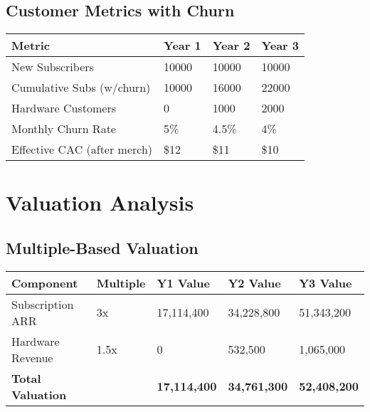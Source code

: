 \documentclass[11pt]{article}
\newcommand{\newSubsYearOne}{10000}
\newcommand{\newSubsYearTwo}{10000}
\newcommand{\newSubsYearThree}{10000}
\newcommand{\totalSubsYearOne}{10000}
\newcommand{\totalSubsYearTwo}{16000}
\newcommand{\totalSubsYearThree}{22000}
\newcommand{\hwCustomersYearTwo}{1000}
\newcommand{\hwCustomersYearThree}{2000}
\newcommand{\churnYearOne}{5}
\newcommand{\churnYearTwo}{4.5}
\newcommand{\churnYearThree}{4}
\newcommand{\arrMultiple}{3}
\newcommand{\hwMultiple}{1.5}
\begin{document}
\subsection{Customer Metrics with Churn}
\begin{table}[H]
\centering
\begin{tabularx}{\linewidth}{l Y Y Y}
\toprule
Metric & Year 1 & Year 2 & Year 3 \\\midrule
New Subscribers & \newSubsYearOne & \newSubsYearTwo & \newSubsYearThree \\
Cumulative Subs (w/churn) & \totalSubsYearOne & \totalSubsYearTwo & \totalSubsYearThree \\
Hardware Customers & 0 & \hwCustomersYearTwo & \hwCustomersYearThree \\
Monthly Churn Rate\cite{recurly2024} & \churnYearOne\% & \churnYearTwo\% & \churnYearThree\% \\
Effective CAC (after merch) & \$12 & \$11 & \$10 \\
\bottomrule
\end{tabularx}
\end{table}

\section{Valuation Analysis}

\subsection{Multiple-Based Valuation}
\begin{table}[H]
\centering
\begin{tabularx}{\linewidth}{l Y Y Y Y}
\toprule
Component & Multiple\cite{highalpha2024,openview2023} & Y1 Value & Y2 Value & Y3 Value \\\midrule
Subscription ARR & \arrMultiple x & 17,114,400 & 34,228,800 & 51,343,200 \\
Hardware Revenue & \hwMultiple x & 0 & 532,500 & 1,065,000 \\\midrule
\textbf{Total Valuation} &  & \textbf{17,114,400} & \textbf{34,761,300} & \textbf{52,408,200} \\
\bottomrule
\end{tabularx}
\end{table}

\end{document}
